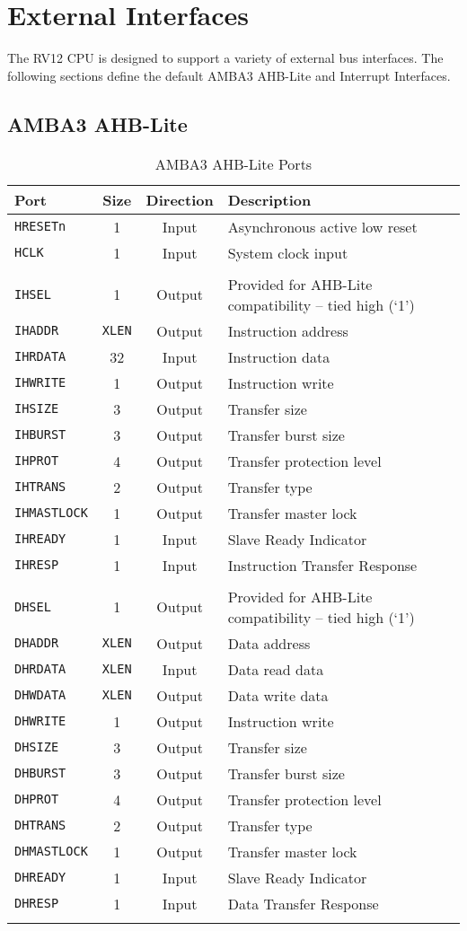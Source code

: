 \chapter{External Interfaces}\label{external-interfaces}

The RV12 CPU is designed to support a variety of external bus interfaces.
The following sections define the default AMBA3 AHB-Lite and Interrupt
Interfaces.

\section{AMBA3 AHB-Lite}\label{amba3-ahb-lite}

\begin{longtable}[]{@{}lccl@{}}
	\toprule
	Port & Size & Direction & Description\tabularnewline
	\midrule
	\endhead
	\texttt{HRESETn}    & 1 & Input & Asynchronous active low reset\tabularnewline
	\texttt{HCLK}       & 1 & Input & System clock input\tabularnewline
	\tabularnewline
	\texttt{IHSEL}      & 1 & Output & Provided for AHB-Lite compatibility -- tied high (`1')\tabularnewline
	\texttt{IHADDR}     & \texttt{XLEN} & Output & Instruction address\tabularnewline
	\texttt{IHRDATA}    & 32 & Input & Instruction data\tabularnewline
	\texttt{IHWRITE}    & 1 & Output & Instruction write\tabularnewline
	\texttt{IHSIZE}     & 3 & Output & Transfer size\tabularnewline
	\texttt{IHBURST}    & 3 & Output & Transfer burst size\tabularnewline
	\texttt{IHPROT}     & 4 & Output & Transfer protection level\tabularnewline
	\texttt{IHTRANS}    & 2 & Output & Transfer type\tabularnewline
	\texttt{IHMASTLOCK} & 1 & Output & Transfer master lock\tabularnewline
	\texttt{IHREADY}    & 1 & Input & Slave Ready Indicator\tabularnewline
	\texttt{IHRESP}     & 1 & Input & Instruction Transfer Response\tabularnewline
	\tabularnewline
	\texttt{DHSEL}      & 1 & Output & Provided for AHB-Lite compatibility -- tied high (`1')\tabularnewline
	\texttt{DHADDR}     & \texttt{XLEN} & Output & Data address\tabularnewline
	\texttt{DHRDATA}    & \texttt{XLEN} & Input & Data read data\tabularnewline
	\texttt{DHWDATA}    & \texttt{XLEN} & Output & Data write data\tabularnewline
	\texttt{DHWRITE}    & 1 & Output & Instruction write\tabularnewline
	\texttt{DHSIZE}     & 3 & Output & Transfer size\tabularnewline
	\texttt{DHBURST}    & 3 & Output & Transfer burst size\tabularnewline
	\texttt{DHPROT}     & 4 & Output & Transfer protection level\tabularnewline
	\texttt{DHTRANS}    & 2 & Output & Transfer type\tabularnewline
	\texttt{DHMASTLOCK} & 1 & Output & Transfer master lock\tabularnewline
	\texttt{DHREADY}    & 1 & Input & Slave Ready Indicator\tabularnewline
	\texttt{DHRESP}     & 1 & Input & Data Transfer Response\tabularnewline
	\bottomrule
	\caption{AMBA3 AHB-Lite Ports}
	\label{tab:ahb-ports}
\end{longtable}

